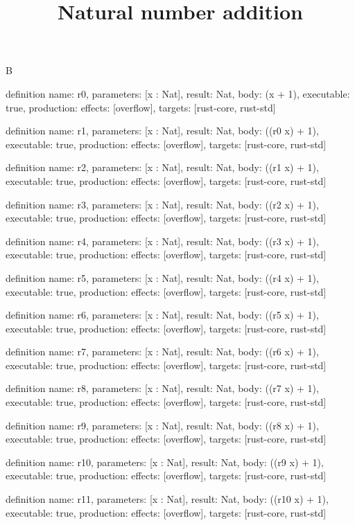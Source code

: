 \begin{lexlean}{B}
\title{Natural number addition}
\begin{semanticmodule}
definition{
  name: r0,
  parameters: [x : Nat],
  result: Nat,
  body: (x + 1),
  executable: true,
  production: {effects: [overflow], targets: [rust-core, rust-std]}
}

definition{
  name: r1,
  parameters: [x : Nat],
  result: Nat,
  body: ((r0 x) + 1),
  executable: true,
  production: {effects: [overflow], targets: [rust-core, rust-std]}
}

definition{
  name: r2,
  parameters: [x : Nat],
  result: Nat,
  body: ((r1 x) + 1),
  executable: true,
  production: {effects: [overflow], targets: [rust-core, rust-std]}
}

definition{
  name: r3,
  parameters: [x : Nat],
  result: Nat,
  body: ((r2 x) + 1),
  executable: true,
  production: {effects: [overflow], targets: [rust-core, rust-std]}
}

definition{
  name: r4,
  parameters: [x : Nat],
  result: Nat,
  body: ((r3 x) + 1),
  executable: true,
  production: {effects: [overflow], targets: [rust-core, rust-std]}
}

definition{
  name: r5,
  parameters: [x : Nat],
  result: Nat,
  body: ((r4 x) + 1),
  executable: true,
  production: {effects: [overflow], targets: [rust-core, rust-std]}
}

definition{
  name: r6,
  parameters: [x : Nat],
  result: Nat,
  body: ((r5 x) + 1),
  executable: true,
  production: {effects: [overflow], targets: [rust-core, rust-std]}
}

definition{
  name: r7,
  parameters: [x : Nat],
  result: Nat,
  body: ((r6 x) + 1),
  executable: true,
  production: {effects: [overflow], targets: [rust-core, rust-std]}
}

definition{
  name: r8,
  parameters: [x : Nat],
  result: Nat,
  body: ((r7 x) + 1),
  executable: true,
  production: {effects: [overflow], targets: [rust-core, rust-std]}
}

definition{
  name: r9,
  parameters: [x : Nat],
  result: Nat,
  body: ((r8 x) + 1),
  executable: true,
  production: {effects: [overflow], targets: [rust-core, rust-std]}
}

definition{
  name: r10,
  parameters: [x : Nat],
  result: Nat,
  body: ((r9 x) + 1),
  executable: true,
  production: {effects: [overflow], targets: [rust-core, rust-std]}
}

definition{
  name: r11,
  parameters: [x : Nat],
  result: Nat,
  body: ((r10 x) + 1),
  executable: true,
  production: {effects: [overflow], targets: [rust-core, rust-std]}
}


\end{semanticmodule}
\end{lexlean}
